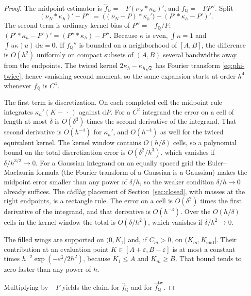 \documentclass[preprint,12pt,authoryear,times]{elsarticle}
\newcommand{\Q}{\mathbb{Q}}
\begin{document}
\begin{proof}
The midpoint estimator is \(\hat f_{\Q}=-F(\nu_N\ast\kappa_h)'\), and \(f_{\Q}=-F P''\). Split
\[
(\nu_N\ast\kappa_h)'-P''
\;=\;
\bigl((\nu_N-P)\ast\kappa_h'\bigr)
+(P'\ast\kappa_h-P')'.
\]
The second term is ordinary kernel bias of \(P''=-f_{\Q}/F\): \((P'\ast\kappa_h-P')'=(P''\ast\kappa_h)-P''\). Because \(\kappa\) is even, \(\int\kappa=1\) and \(\int u\kappa(u)\,\mathrm{d}u=0\). If \(f_{\Q}''\) is bounded on a neighborhood of \([A,B]\), the difference is \(O(h^2)\) uniformly on compact subsets of \((A,B)\) several bandwidths away from the endpoints. The twiced kernel \(2\kappa_h-\kappa_{h\sqrt{2}}\) has Fourier transform \eqref{eq:phi-twice}, hence vanishing second moment, so the same expansion starts at order \(h^4\) whenever \(f_{\Q}\) is \(C^4\).

The first term is discretization. On each completed cell the midpoint rule integrates \(\kappa_h'(K-\,\cdot\,)\) against \(\mathrm{d}P\). For a \(C^2\) integrand the error on a cell of length at most \(\delta\) is \(O(\delta^3)\) times the second derivative of the integrand. That second derivative is \(O(h^{-4})\) for \(\kappa_h'\), and \(O(h^{-4})\) as well for the twiced equivalent kernel. The kernel window contains \(O(h/\delta)\) cells, so a polynomial bound on the total discretization error is \(O(\delta^2/h^3)\), which vanishes if \(\delta/h^{3/2}\to 0\). For a Gaussian integrand on an equally spaced grid the Euler--Maclaurin formula (the Fourier transform of a Gaussian is a Gaussian) makes the midpoint error smaller than any power of \(\delta/h\), so the weaker condition \(\delta/h\to 0\) already suffices. The c\`adl\`ag placement of Section~\ref{sec:closed}, with masses at the right endpoints, is a rectangle rule. The error on a cell is \(O(\delta^2)\) times the first derivative of the integrand, and that derivative is \(O(h^{-3})\). Over the \(O(h/\delta)\) cells in the kernel window the total is \(O(\delta/h^2)\), which vanishes if \(\delta/h^2\to 0\).

The filled wings are supported on \((0,K_1]\) and, if \(C_m>0\), on \((K_m,K_{\mathrm{end}}]\). Their contribution at an evaluation point \(K\in[A+\varepsilon,B-\varepsilon]\) is at most a constant times \(h^{-2}\exp(-\varepsilon^2/2h^2)\), because \(K_1\le A\) and \(K_m\ge B\). That bound tends to zero faster than any power of \(h\).

Multiplying by \(-F\) yields the claim for \(\hat f_{\Q}\) and for \(\hat f_{\Q}^{\mathrm{tw}}\).
\end{proof}
\end{document}
